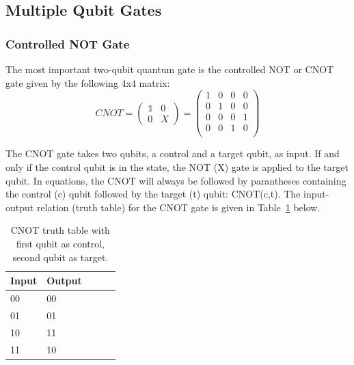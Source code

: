 

\subsection{Multiple Qubit Gates}
\label{subsubsec:multiqubitgates}

\subsubsection{Controlled NOT Gate}
\label{subsubsubsec:cnotgate}

The most important two-qubit quantum gate is the controlled NOT or CNOT gate given by the following 4x4 matrix:
\begin{equation}
CNOT = \begin{pmatrix}
 \mathbb{1} & 0 \\ 
 0 & X
 \end{pmatrix} = \begin{pmatrix}
 1 & 0 & 0 & 0 \\ 
 0 & 1 & 0 & 0 \\
 0 & 0 & 0 & 1 \\
 0 & 0 & 1 & 0 \\
 \end{pmatrix}
\end{equation}

The CNOT gate takes two qubits, a control and a target qubit, as input. If and only if the control qubit is in the \1 state, the NOT (X) gate is applied to the target qubit. In equations, the CNOT will always be followed by parantheses containing the control (c) qubit followed by the target (t) qubit: CNOT(c,t). The input-output relation (truth table) for the CNOT gate is given in Table~\ref{tab:cnottruthtable} below.

\begin{table}[H]
\begin{center}
\caption{CNOT truth table with first qubit as control, second qubit as target.}\vspace{1ex}
\label{tab:cnottruthtable}
\begin{tabular}{llccc}\hline
Input & Output \\ \hline
00 & 00 \\
01 & 01 \\
10 & 11 \\
11 & 10 \\ \hline
\end{tabular}
\end{center}
\end{table}

